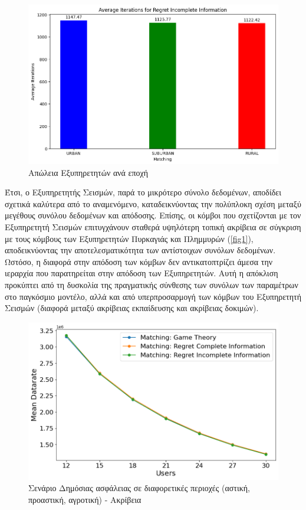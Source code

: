 \newpage

\begin{figure}[ht]
    \centering
    \includegraphics[width=\textwidth]{figures/chapter4/Average_Iterations_per_area_RII.png}
    \caption{Απώλεια Εξυπηρετητών ανά εποχή}
    \label{fig4}
\end{figure}

Έτσι, ο Εξυπηρετητής Σεισμών, παρά το μικρότερο σύνολο δεδομένων, αποδίδει σχετικά καλύτερα από το αναμενόμενο, καταδεικνύοντας την πολύπλοκη σχέση μεταξύ μεγέθους συνόλου δεδομένων και απόδοσης. Επίσης, οι κόμβοι που σχετίζονται με τον Εξυπηρετητή Σεισμών επιτυγχάνουν σταθερά υψηλότερη τοπική ακρίβεια σε σύγκριση με τους κόμβους των Εξυπηρετητών Πυρκαγιάς και Πλημμυρών (\ref{fig1}), αποδεικνύοντας την αποτελεσματικότητα των αντίστοιχων συνόλων δεδομένων. Ωστόσο, η διαφορά στην απόδοση των κόμβων δεν αντικατοπτρίζει άμεσα την ιεραρχία που παρατηρείται στην απόδοση των Εξυπηρετητών. Αυτή η απόκλιση προκύπτει από τη δυσκολία της πραγματικής σύνθεσης των συνόλων των παραμέτρων στο παγκόσμιο μοντέλο, αλλά και από υπερπροσαρμογή των κόμβων του Εξυπηρετητή Σεισμών (διαφορά μεταξύ ακρίβειας εκπαίδευσης και ακρίβειας δοκιμών).

\newpage

\begin{figure}[H]
    \centering
    \includegraphics[width=\textwidth]{figures/chapter4/Mean_Datarate_vs_Users.png}
    \caption{Σενάριο Δημόσιας ασφάλειας σε διαφορετικές περιοχές (αστική, προαστική, αγροτική) - Ακρίβεια}
    \label{fig5}
\end{figure}

